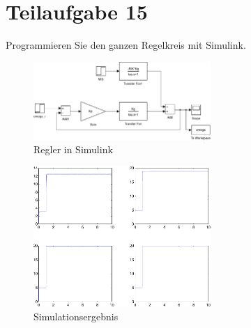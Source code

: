 \section{Teilaufgabe 15}
\begin{aufgabe}
    Programmieren Sie den ganzen Regelkreis mit Simulink.
\end{aufgabe}
\begin{figure}[h!]
    \centering
    \includegraphics[width=0.6\textwidth]{15/regler.pdf}
    \caption{Regler in Simulink}
    \label{fig:15}
\end{figure}
\begin{figure}[h!]
    \centering
    \includegraphics[width=0.6\textwidth]{15/regler_plot.pdf}
    \caption{Simulationsergebnis}
    \label{fig:15plot}
\end{figure}
